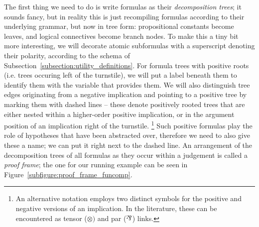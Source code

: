 The first thing we need to do is write formulas as their \textit{decomposition trees}; it sounds fancy, but in reality this is just recompiling formulas according to their underlying grammar, but now in tree form:
propositional constants become leaves, and logical connectives become branch nodes.
To make this a tiny bit more interesting, we will decorate atomic subformulas with a superscript denoting their polarity, according to the schema of Subsection~\ref{subsection:utility_definitions}.
For formula trees with positive roots (i.e. trees occuring left of the turnstile), we will put a label beneath them to identify them with the variable that provides them.
We will also distinguish tree edges originating from a negative implication and pointing to a positive tree by marking them with dashed lines -- these denote positively rooted trees that are either nested within a higher-order positive implication, or in the argument position of an implication right of the turnstile.%
\footnote{An alternative notation employs two distinct symbols for the positive and negative versions of an implication. In the literature, these can be encountered as tensor ($\otimes)$ and par ($\parlink$) links.}
Such positive formulas play the role of hypotheses that have been abstracted over, therefore we need to also give these a name; we can put it right next to the dashed line.
An arrangement of the decomposition trees of all formulas as they occur within a judgement is called a \textit{proof frame}; the one for our running example can be seen in Figure~\ref{subfigure:proof_frame_funcomp}.

